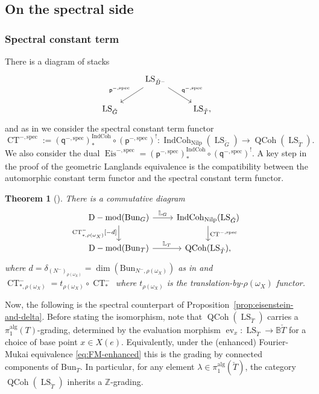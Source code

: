 \documentclass[11pt]{amsart}
\newcommand{\B}{\mathbb{B}}
\newcommand{\Z}{{\mathbb Z}}
\newcommand{\spec}{\mathrm{spec}}
\newcommand{\Bun}{{\mathrm{Bun}}}
\newcommand{\Eis}{\operatorname{Eis}}
\newcommand{\CT}{\operatorname{CT}}
\newcommand{\pp}{{\mathsf{p}}}
\newcommand{\qq}{{\mathsf{q}}}
\newcommand{\Nilp}{\mathrm{Nilp}}
\DeclareMathOperator{\QCoh}{QCoh}
\DeclareMathOperator{\Dmod}{D-mod}
\DeclareMathOperator{\IndCoh}{IndCoh}
\DeclareMathOperator{\LS}{LS}
\newtheorem{thm}{Theorem}[section]
\theoremstyle{remark}
\theoremstyle{definition}
\begin{document}
\subsection{On the spectral side} 

\subsubsection{Spectral constant term}\label{subsec:spectral-constant} There is a diagram of stacks
\[
\begin{tikzcd}
    &\LS_{\check B^-}\arrow[swap]{dl}{\pp^{-,\spec}}\arrow{dr}{\qq^{-,\spec}}\\
    \LS_{\check G}&&\LS_{\check T},
\end{tikzcd}
\]
and as in \cite[\S12.1.1]{GLC3} we consider the spectral constant term functor
\[
\CT^{-,\spec}:=(\qq^{-,\spec})^{\IndCoh}_*\circ(\pp^{-,\spec})^!\colon\IndCoh_\Nilp(\LS_{\check G})\to\QCoh(\LS_{\check T}).
\]
We also consider the dual $\Eis^{-,\spec}=(\pp^{-,\spec})_*^{\IndCoh}\circ(\qq^{-,\spec})^!$.
A key step in the proof of the geometric Langlands equivalence is the compatibility between the automorphic constant term functor and the spectral constant term functor.
\begin{thm}[{\cite[Theorem~15.1.13]{GLC3}}]\label{thm:constant-term-compatibility}
    There is a commutative diagram
    \[\begin{tikzcd}
        \Dmod(\Bun_G)\arrow{r}{\mathbb L_G}\arrow[swap]{d}{\CT^-_{*,\rho(\omega_X)}[-d]}&\IndCoh_\Nilp(\LS_{\check G})\arrow{d}{\CT^{-,\spec}}\\
        \Dmod(\Bun_T)\arrow{r}{\mathbb L_T}&\QCoh(\LS_{\check T}),
    \end{tikzcd}
    \]
    where $d=\delta_{(N^-)_{\rho(\omega_X)}}=\dim(\Bun_{N^-,\rho(\omega_X)})$ as in \cite[\S9.6.5]{GLC2} and $\CT^-_{*,\rho(\omega_X)}=t_{\rho(\omega_X)}\circ\CT^-_*$ where $t_{\rho(\omega_X)}$ is the translation-by-$\rho(\omega_X)$ functor.
\end{thm}
Now, the following is the spectral counterpart of Proposition~\ref{prop:eisenstein-and-delta}. Before stating the isomorphism, note that $\QCoh(\LS_{\check T})$ carries a $\pi_1^{\mathrm{alg}}(T)$-grading, determined by the evaluation morphism $\operatorname{ev}_x\colon\LS_{\check T}\to\B\check T$ for a choice of base point $x\in X(e)$. Equivalently, under the (enhanced) Fourier-Mukai equivalence \eqref{eq:FM-enhanced} this is the grading by connected components of $\Bun_T$. In particular, for any element $\lambda\in\pi_1^{\mathrm{alg}}(\check T)$, the category $\QCoh(\LS_{\check T})$ inherits a $\Z$-grading.
\end{document}
